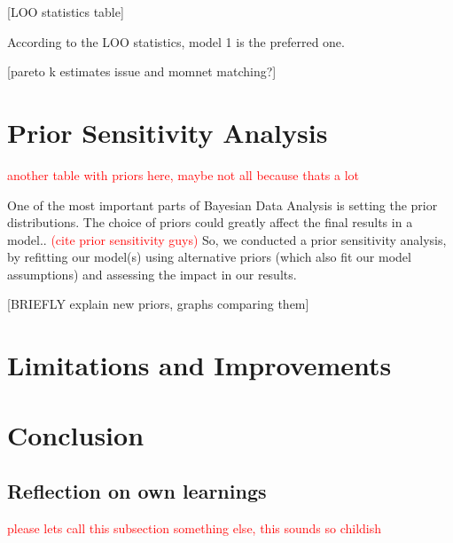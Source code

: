 \documentclass[12pt]{article}
\begin{document}
[LOO statistics table]

According to the LOO statistics, model 1 is the preferred one.

[pareto k estimates issue and momnet matching?]


\section{Prior Sensitivity Analysis}

\textcolor{red}{another table with priors here, maybe not all because thats a lot}

One of the most important parts of Bayesian Data Analysis is setting the prior distributions. The choice of priors could greatly affect the final results in a model..  \textcolor{red}{(cite prior sensitivity guys)}
So, we conducted a prior sensitivity analysis, by refitting our model(s) using alternative priors (which also fit our model assumptions) and assessing the impact in our results.

[BRIEFLY explain new priors, graphs comparing them]



\section{Limitations and Improvements}


\section{Conclusion}

\subsection{Reflection on own learnings}

\textcolor{red}{please lets call this subsection something else, this sounds so childish}


\printbibliography
\end{document}
